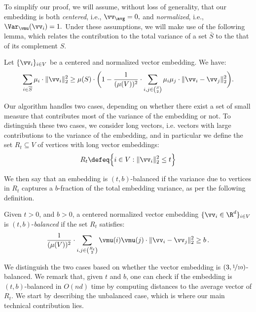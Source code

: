 \documentclass[letterpaper]{article}
\begin{document}
To simplify our proof, we will assume, without loss of generality, that our embedding is both \emph{centered},
i.e., $\vv_{\avg} = 0,$
and \emph{normalized}, i.e., $\Var_{\vmu} (\vv_i) = 1.$
Under these assumptions, we will make use of the following lemma, which relates the contribution to the total variance of a set $\bar{S}$ to the that of its complement $S$.
\begin{lemma}
\label{lem.variance}
Let $\{ \vv_i \}_{i \in V}$ be a centered and normalized vector embedding. We have:
\begin{equation*}
\sum_{i \in \overline{S}} \mu_i \cdot \lVert \vv_i \rVert_2^2 \geq \mu(S) \cdot  \bigg( 1 - \frac{1}{(\mu(V))^2} \cdot \sum_{i,j \in \binom{S}{2}} \mu_i \mu_j \cdot \lVert \vv_i - \vv_j \rVert_2^2 \bigg).
\end{equation*}
\end{lemma}

Our algorithm handles two cases, depending on whether there exist a set of small measure that contributes most of the variance of the embedding or not.
To distinguish these two cases, we consider long vectors, i.e. vectors with large contributions to the variance of the embedding, and in particular we define the set $R_t \subseteq V$ of vertices with long vector embeddings:
\begin{equation*}
R_t \defeq \Big\{ i \in V : \lVert \vv_i \rVert_2^2 \leq t \Big\}
\end{equation*}

We then say that an embedding is $(t, b)$-balanced if the variance due to vertices in $R_t$ captures a $b$-fraction of the total embedding variance, as per the following definition.

\begin{definition}\label{def.balanced-embedding}
Given $t > 0$, and $b > 0$, a centered normalized vector embedding $\{ \vv_{i} \in \R^d \}_{i \in V}$ is $(t, b)$-\emph{balanced} if the set $R_t$ satisfies:
\begin{equation*}
\frac{1}{(\mu(V))^2} \cdot \sum_{i,j \in \binom{R_t}{2}} \vmu(i) \vmu(j) \cdot \lVert \vv_i - \vv_j \rVert_2^2
\geq b \,.
\end{equation*}
\end{definition}

We distinguish the two cases based on whether the vector embedding is $(3,\nicefrac{1}{10})$-balanced.
We remark that, given $t$ and $b$, one can check if the embedding is $(t, b)$-balanced in $O(nd)$ time by computing distances to the average vector of $R_t$.
We start by describing the unbalanced case, which is where our main technical contribution lies.
\end{document}
